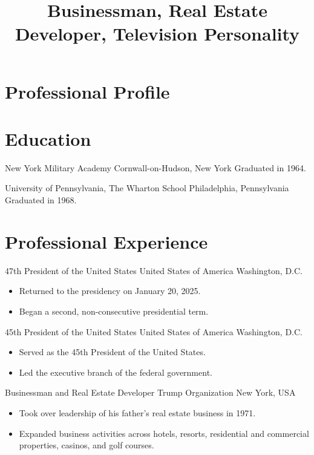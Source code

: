 \documentclass[11pt,a4paper,sans]{moderncv}
\title{Businessman, Real Estate Developer, Television Personality}
\begin{document}
\makecvtitle

\section{Professional Profile}


\section{Education}

{New York Military Academy}
{Cornwall-on-Hudson, New York}
{}{Graduated in 1964.}

{University of Pennsylvania, The Wharton School}
{Philadelphia, Pennsylvania}
{}{Graduated in 1968.}

\section{Professional Experience}

{47th President of the United States}
{United States of America}
{Washington, D.C.}
{}{
\begin{itemize}
    \item Returned to the presidency on January 20, 2025.
    \item Began a second, non-consecutive presidential term.
\end{itemize}
}

{45th President of the United States}
{United States of America}
{Washington, D.C.}
{}{
\begin{itemize}
    \item Served as the 45th President of the United States.
    \item Led the executive branch of the federal government.
\end{itemize}
}

{Businessman and Real Estate Developer}
{Trump Organization}
{New York, USA}
{}{
\begin{itemize}
    \item Took over leadership of his father's real estate business in 1971.
    \item Expanded business activities across hotels, resorts,
    residential and commercial properties, casinos, and golf courses.
\end{itemize}
}
\end{document}
